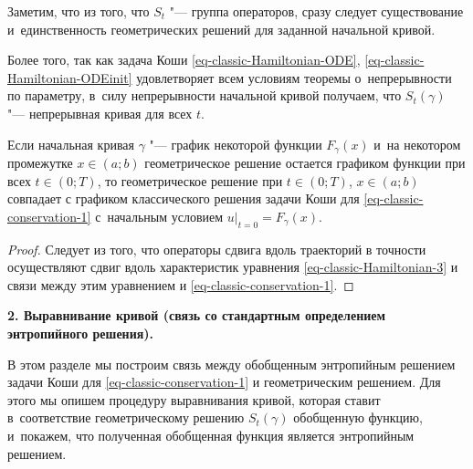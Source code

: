 \smallskip



Заметим, что из того, что $S_t$ "--- группа операторов, сразу следует существование и~единственность геометрических решений для заданной начальной кривой. 

Более того, так как задача Коши \eqref{eq-classic-Hamiltonian-ODE}, \eqref{eq-classic-Hamiltonian-ODEinit} удовлетворяет всем условиям теоремы о~непрерывности по параметру,  в~силу непрерывности начальной кривой получаем, что $S_t(\gamma)$ "--- непрерывная кривая для всех $t$.



\smallskip



\hypertarget{remark1}{}



\begin{remark}[1] Если начальная кривая $\gamma$ "--- график некоторой функции $F_{\gamma}(x)$ и~на некотором промежутке $x\in (a;b)$ геометрическое решение остается графиком функции при всех $t\in(0;T)$, то геометрическое решение при ${t\in(0;T)}$, $x\in(a;b)$ совпадает с графиком классического решения задачи Коши для \eqref{eq-classic-conservation-1} с~начальным условием $u\bigr|_{t=0}=F_{\gamma}(x)$.

\end{remark}



\smallskip



\begin{proof} Следует из того, что операторы сдвига вдоль траекторий в точности осуществляют сдвиг вдоль характеристик уравнения \eqref{eq-classic-Hamiltonian-3} и связи между этим уравнением и \eqref{eq-classic-conservation-1}. \hfill

\end{proof}



\bigskip



{\bf 2. Выравнивание кривой (связь со стандартным определением энтропийного решения).}

В этом разделе мы построим связь между обобщенным энтропийным решением задачи Коши для \eqref{eq-classic-conservation-1} и геометрическим решением. Для этого мы опишем процедуру выравнивания кривой, которая ставит в~соответствие геометрическому решению $S_t(\gamma)$ обобщенную функцию, и~покажем, что полученная обобщенная функция является энтропийным решением.



